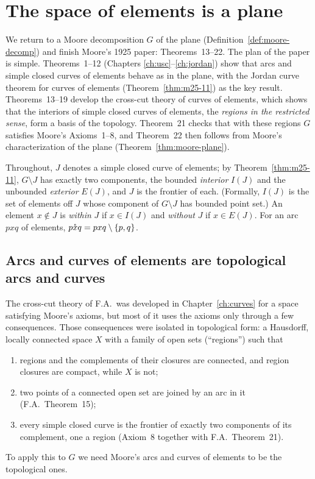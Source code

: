 \chapter{The space of elements is a plane}\label{ch:quotient}

We return to a Moore decomposition $G$ of the plane (Definition~\ref{def:moore-decomp}) and finish
Moore's 1925 paper: Theorems~13--22. The plan of the paper is simple. Theorems~1--12 (Chapters
\ref{ch:usc}--\ref{ch:jordan}) show that arcs and simple closed curves of elements behave as in the plane,
with the Jordan curve theorem for curves of elements (Theorem~\ref{thm:m25-11}) as the key result.
Theorems~13--19 develop the cross-cut theory of curves of elements, which shows that the
interiors of simple closed curves of elements, the \emph{regions in the restricted sense}, form a basis of the
topology. Theorem~21 checks that with these regions $G$ satisfies Moore's Axioms~1--8, and Theorem~22 then
follows from Moore's characterization of the plane (Theorem~\ref{thm:moore-plane}).

Throughout, $J$ denotes a simple closed curve of elements; by Theorem~\ref{thm:m25-11},
$G\setminus J$ has exactly two components, the bounded \emph{interior} $I(J)$ and the unbounded
\emph{exterior} $E(J)$, and $J$ is the frontier of each. (Formally, $I(J)$ is the set of elements off
$J$ whose component of $G\setminus J$ has bounded point set.) An element $x\notin J$ is
\emph{within} $J$ if $x\in I(J)$ and \emph{without} $J$ if $x\in E(J)$. For an arc $pxq$ of elements,
$\mathring{pxq}=pxq\setminus\left\{ p,q \right\}$.


\section{Arcs and curves of elements are topological arcs and curves}

The cross-cut theory of F.A.\ was developed in Chapter~\ref{ch:curves} for a space satisfying Moore's
axioms, but most of it uses the axioms only through a few consequences. Those consequences were isolated
in topological form: a Hausdorff, locally connected space $X$ with a family of open sets (``regions'')
such that
\begin{enumerate}[label=(\roman*)]
\item regions and the complements of their closures are connected, and region closures are compact,
while $X$ is not;
\item two points of a connected open set are joined by an arc in it (F.A.\ Theorem~15);
\item every simple closed curve is the frontier of exactly two components of its complement, one a region
(Axiom~8 together with F.A.\ Theorem~21).
\end{enumerate}
To apply this to $G$ we need Moore's arcs and curves of elements to be the topological ones.

